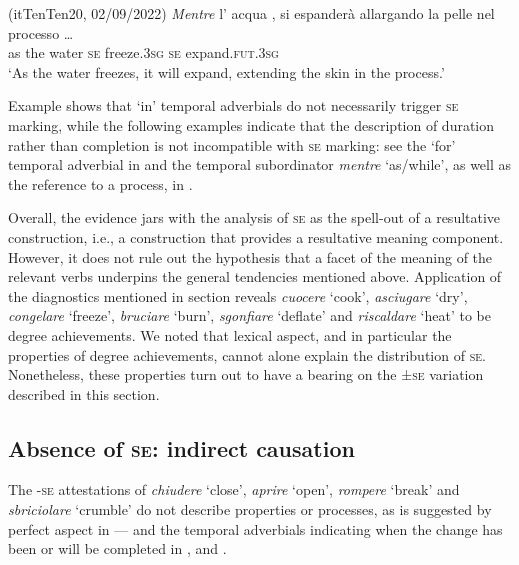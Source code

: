 \documentclass[output=paper,colorlinks,citecolor=brown
]{langscibook}
\begin{document}
\hspace*{\fill}(itTenTen20, 02/09/2022)\quad
\ea \label{bentley_example_28}
    \gll \textit{Mentre}	l’		acqua		
    ,			si		espanderà {	allargando la pelle
      nel processo \ldots}\\
    	as						the	water		\textsc{se}		freeze.3\textsc{sg}		\textsc{se}		expand.\textsc{fut}.3\textsc{sg} {} \\
    \glt 	‘As the water freezes, it will expand, extending the skin in the process.’
\z

Example  shows that ‘in’ temporal adverbials do not necessarily trigger \textsc{se} marking, while the following examples indicate that the description of duration rather than completion is not incompatible with \textsc{se} marking: see the ‘for’ temporal adverbial in  and the temporal subordinator \textit{mentre} ‘as/while’, as well as the reference to a process, in . 

Overall, the evidence jars with the analysis of \textsc{se} as the spell-out of a resultative construction, i.e., a construction that provides a resultative meaning component. However, it does not rule out the hypothesis that a facet of the meaning of the relevant verbs underpins the general tendencies mentioned above. Application of the diagnostics mentioned in section  reveals \textit{cuocere} ‘cook’, \textit{asciugare} ‘dry’, \textit{congelare} ‘freeze’, \textit{bruciare} ‘burn’, \textit{sgonfiare} ‘deflate’ and \textit{riscaldare} ‘heat’ to be degree achievements. We noted that lexical aspect, and in particular the properties of degree achievements, cannot alone explain the distribution of \textsc{se}. Nonetheless, these properties turn out to have a bearing on the ±\textsc{se} variation described in this section. 

\subsection{Absence of \textsc{se}: indirect causation}
\label{bentley_section_4.2}
The -\textsc{se} attestations of \textit{chiudere} ‘close’, \textit{aprire} ‘open’, \textit{rompere} ‘break’ and \textit{sbriciolare} ‘crumble’ do not describe properties or processes, as is suggested by perfect aspect in — and the temporal adverbials indicating when the change has been or will be completed in ,  and .
\end{document}
